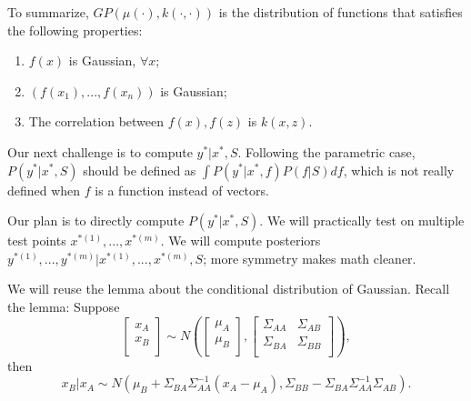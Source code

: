 To summarize, $GP(\mu(\cdot), k(\cdot, \cdot))$ is the distribution of functions that satisfies the following properties:
\begin{enumerate}
	\item $f(x)$ is Gaussian, $\forall x$;
	\item $(f(x_1), ..., f(x_n))$ is Gaussian;
	\item The correlation between $f(x), f(z)$ is $k(x, z)$.
\end{enumerate}

Our next challenge is to compute $y^* | x^*, S$. Following the parametric case, $P(y^* | x^*, S)$ should be defined as $\int P(y^* | x^*, f) P(f | S) df$, which is not really defined when $f$ is a function instead of vectors. 

Our plan is to directly compute $P(y^* | x^*, S)$. We will practically test on multiple test points $x^{*(1)}, ..., x^{*(m)}$. We will compute posteriors $y^{*(1)}, ..., y^{*(m)} | x^{*(1)}, ..., x^{*(m)}, S$; more symmetry makes math cleaner.

We will reuse the lemma about the conditional distribution of Gaussian. Recall the lemma: Suppose 
\begin{equation*}\label{eu_eqn}
	\begin{bmatrix}
		x_A\\
		x_B\\
	\end{bmatrix}
	\sim N(
	\begin{bmatrix}
		\mu_A\\
		\mu_B\\
	\end{bmatrix}
	,
	\begin{bmatrix}
		\Sigma_{AA} & \Sigma_{AB} \\
		\Sigma_{BA} & \Sigma_{BB} \\
	\end{bmatrix}
	),
\end{equation*}
then 
\begin{equation*}\label{eu_eqn}
	x_B | x_A \sim N(\mu_B + \Sigma_{BA} \Sigma_{AA}^{-1} (x_A - \mu_A), \Sigma_{BB} - \Sigma_{BA} \Sigma_{AA}^{-1} \Sigma_{AB}) .
\end{equation*}

